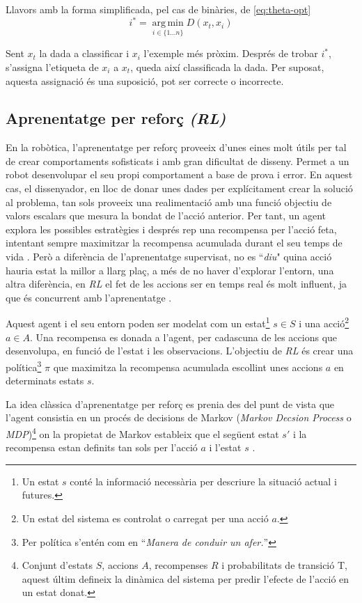 \documentclass[12pt,a4paper,final,twoside]{report}
\begin{document}
Llavors amb la forma simplificada, pel cas de binàries, de \eqref{eq:theta-opt}
\begin{equation} \label{eq:theta-opt-exemple}
i^*=\operatorname*{arg\,min}_{i\in\{1\dots n\}} D(x_{t}, x_{i})
\end{equation}

Sent $x_{t}$ la dada a classificar i $x_{i}$ l'exemple més pròxim. Després de trobar $i^*$, s'assigna l'etiqueta de $x_{i}$ a $x_{t}$, queda així classificada la dada. Per suposat, aquesta assignació és una suposició, pot ser correcte o incorrecte.


\subsection{Aprenentatge per reforç \textit{(RL)}}
\label{RL-estat-de-l'art}

En la robòtica, l'aprenentatge per reforç proveeix d'unes eines molt útils per tal de crear comportaments sofisticats i amb gran dificultat de disseny. Permet a un robot desenvolupar el seu propi comportament a base de prova i error. En aquest cas, el dissenyador, en lloc de donar unes dades per explícitament crear la solució al problema, tan sols proveeix una realimentació amb una funció objectiu de valors escalars que mesura la bondat de l'acció anterior. Per tant, un agent explora les possibles estratègies i després rep una recompensa per l'acció feta, intentant sempre maximitzar la recompensa acumulada durant el seu temps de vida \cite{Kober2009}. Però a diferència de l'aprenentatge supervisat, no es ``\textit{diu}"  quina acció hauria estat la millor a llarg plaç, a més de no haver d'explorar l'entorn, una altra diferència, en \textit{RL} el fet de les accions ser en temps real és molt influent, ja que és concurrent amb l'aprenentatge \cite{Kaelbling1996}. 

Aquest agent i el seu entorn poden ser modelat com un estat\footnote{Un estat $s$ conté la informació necessària per descriure la situació actual i futures.}  $s\in S $ i una acció\footnote{Un estat del sistema es controlat o carregat per una acció $a$.}  $a \in A$. Una recompensa es donada a l'agent, per cadascuna de les accions que desenvolupa, en funció de l'estat i les observacions. L'objectiu de \textit{RL} és crear una política\footnote{Per política s'entén com en \cite{iec-dlc} ``\textit{Manera de conduir un afer.}''} $\pi$ que maximitza la recompensa acumulada escollint unes accions $a$ en determinats estats $s$.

La idea clàssica d'aprenentatge per reforç es prenia des del punt de vista que l'agent consistia en un procés de decisions de Markov (\textit{Markov Decsion Process} o \textit{MDP})\footnote{Conjunt d'estats $S$, accions $A$, recompenses $R$ i probabilitats de transició T, aquest últim defineix la dinàmica del sistema per predir l'efecte de l'acció en un estat donat.} on la propietat de Markov estableix que el següent estat $s'$ i la recompensa estan definits tan sols per l'acció $a$ i l'estat $s$ \cite{Sutton1998}. %
\end{document}
